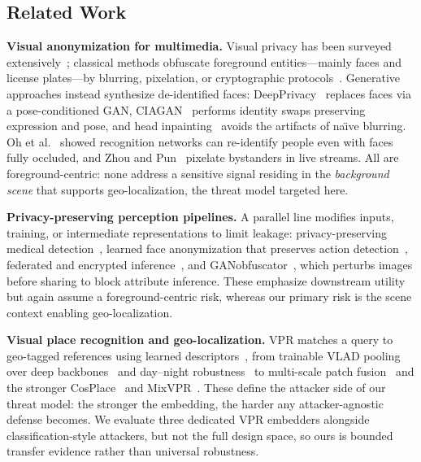 \documentclass[10pt,journal]{IEEEtran}
\begin{document}
\subsection{Related Work}
\textbf{Visual anonymization for multimedia.}
Visual privacy has been surveyed extensively~\cite{padilla2015visual,ribaric2016deidentification}; classical methods obfuscate foreground entities---mainly faces and license plates---by blurring, pixelation, or cryptographic protocols~\cite{Chamikara2020101951,Li2019212,avidan2007efficient,erkin2009privacy}. Generative approaches instead synthesize de-identified faces: DeepPrivacy~\cite{hukkelaas2019deepprivacy} replaces faces via a pose-conditioned GAN, CIAGAN~\cite{maximov2020ciagan} performs identity swaps preserving expression and pose, and head inpainting~\cite{sun2018natural} avoids the artifacts of na\"{\i}ve blurring. Oh et al.~\cite{oh2016faceless} showed recognition networks can re-identify people even with faces fully occluded, and Zhou and Pun~\cite{zhou2020personal} pixelate bystanders in live streams. All are foreground-centric: none address a sensitive signal residing in the \emph{background scene} that supports geo-localization, the threat model targeted here.

\textbf{Privacy-preserving perception pipelines.}
A parallel line modifies inputs, training, or intermediate representations to limit leakage: privacy-preserving medical detection~\cite{liu2019privacy}, learned face anonymization that preserves action detection~\cite{ren2018learning}, federated and encrypted inference~\cite{kaissis2020secure}, and GANobfuscator~\cite{xu2019ganobfuscator}, which perturbs images before sharing to block attribute inference. These emphasize downstream utility but again assume a foreground-centric risk, whereas our primary risk is the scene context enabling geo-localization.

\textbf{Visual place recognition and geo-localization.}
VPR matches a query to geo-tagged references using learned
descriptors~\cite{lowry2016visual,masone2021survey}, from trainable VLAD
pooling over deep backbones~\cite{arandjelovic2016netvlad,he2016deep} and
day--night robustness~\cite{torii201524} to multi-scale patch
fusion~\cite{hausler2021patchnetvlad} and the stronger
CosPlace~\cite{berton2022rethinking} and MixVPR~\cite{ali2023mixvpr}. These
define the attacker side of our threat model: the stronger the embedding, the
harder any attacker-agnostic defense becomes. We evaluate three dedicated VPR
embedders alongside classification-style attackers, but not the full design
space, so ours is bounded transfer evidence rather than universal robustness.
\end{document}
